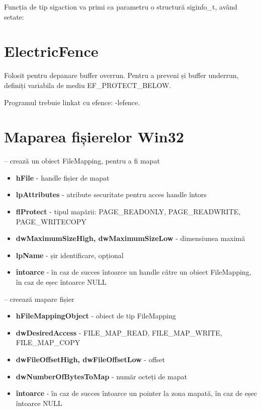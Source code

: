 \documentclass{refcard.cs.pub.ro}
\begin{document}
\begin{multicols*}{3}
Funcția de tip sigaction va primi ca parametru o structură siginfo_t,
având
setate:
\begin{params}
\param{}{}
\end{params}

\section{ElectricFence}

Folosit pentru depanare buffer overrun. Pentru a preveni și buffer underrun,
definiți variabila de mediu EF_PROTECT_BELOW.

Programul trebuie linkat cu efence: -lefence.



\section{Maparea fișierelor Win32}

 -- crează un obiect FileMapping, pentru a fi mapat
\begin{itemize}
\item \textbf{hFile} - handle fișier de mapat
\item \textbf{lpAttributes} - atribute securitate pentru acces handle întors
\item \textbf{flProtect} - tipul mapării: PAGE_READONLY, PAGE_READWRITE,
PAGE_WRITECOPY
\item \textbf{dwMaximumSizeHigh, dwMaximumSizeLow} - dimensiunea maximă
\item \textbf{lpName} - șir identificare, opțional
\item \textbf{întoarce} - în caz de succes întoarce un handle către un
obiect FileMapping, în caz de eșec întoarce NULL
\end{itemize}

 -- creează mapare fișier
\begin{itemize}
\item \textbf{hFileMappingObject} - obiect de tip FileMapping
\item \textbf{dwDesiredAccess} - FILE_MAP_READ, FILE_MAP_WRITE, FILE_MAP_COPY
\item \textbf{dwFileOffsetHigh, dwFileOffsetLow} - offset
\item \textbf{dwNumberOfBytesToMap} - număr octeți de mapat
\item \textbf{întoarce} - în caz de succes întoarce un pointer la zona
mapată, în caz de eșec întoarce NULL
\end{itemize}


\end{multicols*}
\end{document}
